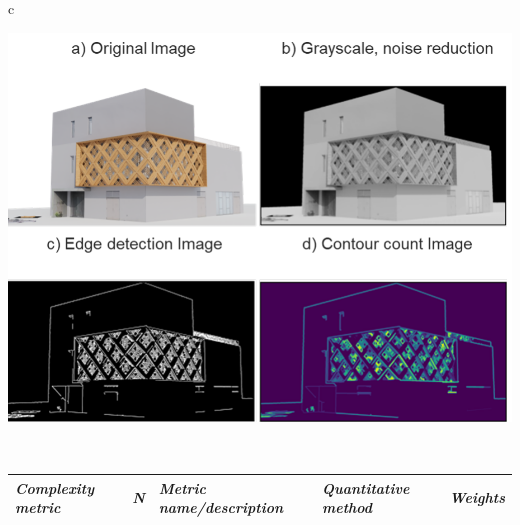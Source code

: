 \documentclass[final,5p,times]{elsarticle}
\begin{document}
\begin{table}[htb]
\begin{tabular}{c}
\begin{minipage}{\textwidth}
\begin{minipage}{0.49\textwidth}
                        \label{fig:ComplexityPlotHistory}
                    \end{minipage}
                    \hfill %
                    \begin{minipage}{0.49\textwidth}
                        \includegraphics[width= \linewidth]{Images/CICARenderPlot}
                        \label{fig:ComplexityPlotRenderCICA}
                    \end{minipage}
                \end{minipage}
                \\
                \begin{minipage}{\textwidth}
                    \centering
                    \label{tab:MetricsandWeights}
                    \begin{tabularx}{\textwidth}{p{3.5cm} p{1cm} X X p{1cm}}
                        \toprule
                        \textit{Complexity metric} &
                          \textit{N} &
                          \textit{Metric name/description} &
                          \textit{Quantitative   method} &
                          \textit{Weights} \\ \midrule

\end{tabularx}
\end{minipage}
\end{tabular}
\end{table}
\end{document}
